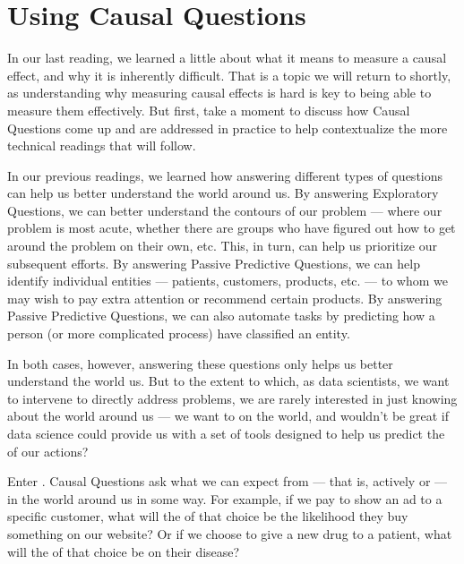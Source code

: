 \documentclass[letterpaper,10pt,english]{jupyterBook}
\begin{document}
\sphinxstepscope


\chapter{Using Causal Questions}
\label{\detokenize{30_questions/30_using_causal_questions:using-causal-questions}}\label{\detokenize{30_questions/30_using_causal_questions::doc}}
\sphinxAtStartPar
In our last reading, we learned a little about what it means to measure a causal effect, and why it is inherently difficult. That is a topic we will return to shortly, as understanding why measuring causal effects is hard is key to being able to measure them effectively. But first, take a moment to discuss how Causal Questions come up and are addressed in practice to help contextualize the more technical readings that will follow.

\sphinxAtStartPar
In our previous readings, we learned how answering different types of questions can help us better understand the world around us. By answering Exploratory Questions, we can better understand the contours of our problem — where our problem is most acute, whether there are groups who have figured out how to get around the problem on their own, etc. This, in turn, can help us prioritize our subsequent efforts. By answering Passive Predictive Questions, we can help identify individual entities — patients, customers, products, etc. — to whom we may wish to pay extra attention or recommend certain products. By answering Passive Predictive Questions, we can also automate tasks by predicting how a person (or more complicated process)  have classified an entity.

\sphinxAtStartPar
In both cases, however, answering these questions only helps us better understand the world  us. But to the extent to which, as data scientists, we want to intervene to directly address problems, we are rarely interested in just knowing about the world around us — we want to  on the world, and wouldn’t be great if data science could provide us with a set of tools designed to help us predict the  of our actions?

\sphinxAtStartPar
Enter . Causal Questions ask what  we can expect from  — that is, actively  or  — in the world around us in some way. For example, if we pay to show an ad to a specific customer, what will the  of that choice be the likelihood they buy something on our website? Or if we choose to give a new drug to a patient, what will the  of that choice be on their disease?
\end{document}
